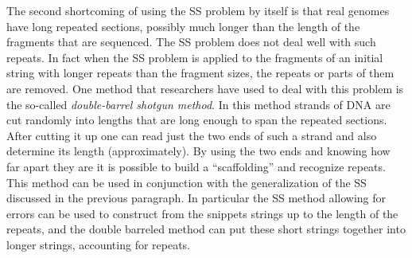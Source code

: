 \begin{cluster}
\label{grp:grm:genome::shortcoming}

\begin{gram}
\label{grm:genome::shortcoming}
The second shortcoming of using the SS problem by itself is that real
genomes have long repeated sections, possibly much longer than the
length of the fragments that are sequenced.  The SS problem does not
deal well with such repeats.  In fact when the SS problem is applied
to the fragments of an initial string with longer repeats than the
fragment sizes, the repeats or parts of them are removed.  One method
that researchers have used to deal with this problem is the so-called
\emph{double-barrel shotgun method}.  In this method strands of DNA
are cut randomly into lengths that are long enough to span the
repeated sections.  After cutting it up one can read just the two ends
of such a strand and also determine its length (approximately).  By
using the two ends and knowing how far apart they are it is possible
to build a ``scaffolding'' and recognize repeats.  This method can be
used in conjunction with the generalization of the SS discussed in the
previous paragraph.  In particular the SS method allowing for errors
can be used to construct from the snippets strings up to the length of the repeats, and
the double barreled method can put these short strings together into
longer strings, accounting for repeats.

\end{gram}
\end{cluster}

